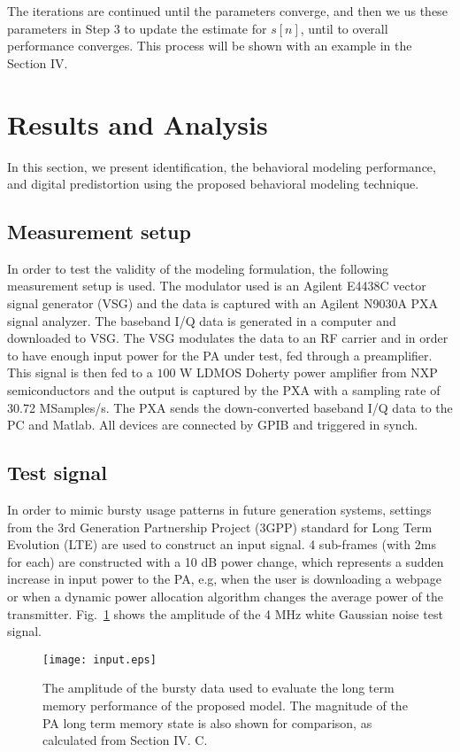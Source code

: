 \documentclass[journal]{IEEEtran}
\begin{document}
The iterations are continued until the parameters converge, and then we us these parameters in Step 3 to update the estimate for $s[n]$, until to overall performance converges. This process will be shown with an example in the Section IV.

\section{Results and Analysis}
In this section, we present identification, the behavioral modeling performance, and digital predistortion using the proposed behavioral modeling technique.

\subsection{Measurement setup}
In order to test the validity of the modeling formulation, the following measurement setup is used. The modulator used
is an Agilent E4438C vector signal generator (VSG) and the data is captured with an Agilent N9030A PXA signal analyzer. The baseband I/Q data is generated in a computer and
downloaded to VSG. The VSG modulates the data to an RF carrier and
in order to have enough input power for the PA under test, fed
through a preamplifier. This signal is then fed to a $100$ W LDMOS Doherty power amplifier from NXP semiconductors and the output is captured by the PXA with a sampling rate of 30.72 MSamples/s. The
PXA sends the down-converted baseband I/Q data to the PC and Matlab. All devices are connected by
GPIB and triggered in synch.

\subsection{Test signal}
In order to mimic bursty usage patterns in future generation systems, settings from the 3rd Generation Partnership Project (3GPP) standard for Long Term Evolution (LTE) \cite{lte} are used to construct an input signal. 4 sub-frames (with 2ms for each) are constructed with a 10 dB power change, which represents a sudden increase in input power to the PA, e.g, when the user is downloading a webpage or when a dynamic power allocation algorithm changes the average power of the transmitter. Fig.~\ref{input} shows the amplitude of the 4 MHz white Gaussian noise test signal.
\begin{figure}
\centering
\texttt{[image: input.eps]}
\caption{The amplitude of the bursty data used to evaluate the long term memory performance of the proposed model. The magnitude of the PA long term memory state is also shown for comparison, as calculated from Section IV. C. } \label{input}
\end{figure}
\end{document}
